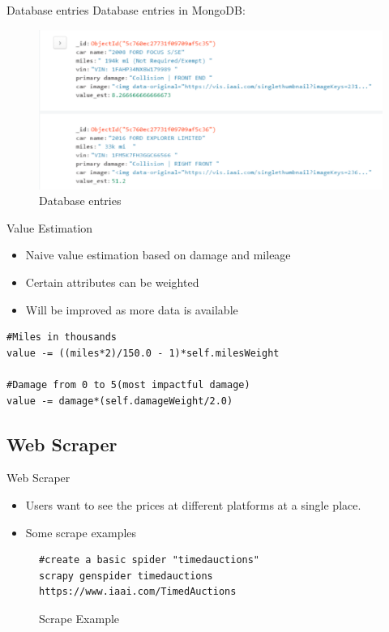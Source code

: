 \documentclass{beamer}
\begin{document}
\begin{frame}[fragile=singleslide]{Database entries}
Database entries in MongoDB:

\begin{figure}[H]
\centering
\includegraphics[scale=0.55]{db}
\caption{Database entries}
\label{fig:dbEntries}
\end{figure}
\end{frame}

\begin{frame}[fragile=singleslide]{Value Estimation}
\begin{itemize}
\setlength\itemsep{2em}
\item Naive value estimation based on damage and mileage
\item Certain attributes can be weighted
\item Will be improved as more data is available
\end{itemize}


\begin{verbatim}
#Miles in thousands
value -= ((miles*2)/150.0 - 1)*self.milesWeight

#Damage from 0 to 5(most impactful damage) 
value -= damage*(self.damageWeight/2.0)
\end{verbatim}

\end{frame}

\subsection{Web Scraper}
\begin{frame}[fragile=singleslide]{Web Scraper}
\begin{itemize}
    \setlength\itemsep{2em}
    \item Users want to see the prices at different platforms at a single place.
    \item Some scrape examples
\end{itemize}

\begin{figure}[ht]
\centering

\begin{verbatim}
#create a basic spider "timedauctions"
scrapy genspider timedauctions
https://www.iaai.com/TimedAuctions
\end{verbatim}

\caption{Scrape Example}
\end{figure}

\end{frame}
\end{document}
